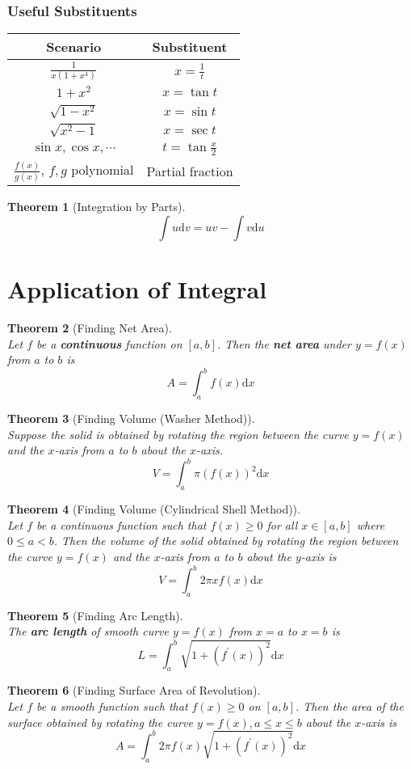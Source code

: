 \documentclass[12pt]{article}
\newcommand{\diff}{\mathrm{d}}
\newtheorem{theorem}{Theorem}[section]
\theoremstyle{definition}
\begin{document}
\subsubsection{Useful Substituents}
\begin{table}[h]
\centering
\begin{tabular}{|c|c|}
\hline
Scenario& Substituent\\\hline
$\frac{1}{x(1+x^4)}$&$x=\frac{1}{t}$\\\hline
$1+x^2$&$x=\tan t$\\\hline
$\sqrt{1-x^2}$&$x=\sin t$\\\hline
$\sqrt{x^2-1}$&$x=\sec t$\\\hline
$\sin x,\cos x,\cdots$ &$t=\tan\frac{x}{2}$\\\hline
$\frac{f(x)}{g(x)}$, $f,g$ polynomial&Partial fraction\\\hline
\end{tabular}
\end{table}
\begin{theorem}[Integration by Parts]
\hfill\\
\normalfont
\[
\int u\diff v = uv - \int v\diff u
\]
\end{theorem}
\clearpage
\section{Application of Integral}
\begin{theorem}[Finding Net Area]
\hfill\\
\normalfont Let $f$ be a \textbf{continuous} function on $[a,b]$. Then the \textbf{net area} under $y=f(x)$ from $a$ to $b$ is
\[
A=\int^b_a f(x)\diff x
\]
\end{theorem}
\begin{theorem}[Finding Volume (Washer Method)]
\hfill\\
\normalfont Suppose the solid is obtained by rotating the region between the curve $y=f(x)$ and the $x$-axis from $a$ to $b$ about the $x$-axis.
\[
V=\int^b_a \pi(f(x))^2 \diff x
\]
\end{theorem}
\begin{theorem}[Finding Volume (Cylindrical Shell Method)]
\hfill\\
\normalfont Let $f$ be a continuous function such that $f(x)\geq 0$ for all $x\in[a,b]$ where $0\leq a<b$. Then the volume of the solid obtained by rotating the region between the curve $y=f(x)$ and the $x$-axis from $a$ to $b$ about the $y$-axis is
\[
V=\int^b_a 2\pi xf(x)\diff x
\]
\end{theorem}
\begin{theorem}[Finding Arc Length]
\hfill\\
\normalfont The \textbf{arc length} of smooth curve $y=f(x)$ from $x=a$ to $x=b$ is
\[
L=\int^b_a\sqrt{1+(f^\prime(x))^2}\diff x
\]
\end{theorem}
\begin{theorem}[Finding Surface Area of Revolution]
\hfill\\
\normalfont Let $f$ be a smooth function such that $f(x)\geq 0$ on $[a,b]$. Then the area of the surface obtained by rotating the curve $y=f(x), a\leq x\leq b$ about the $x$-axis is
\[
A=\int^b_a 2\pi f(x)\sqrt{1+(f^\prime(x))^2}\diff x
\]
\end{theorem}
\clearpage
\end{document}
